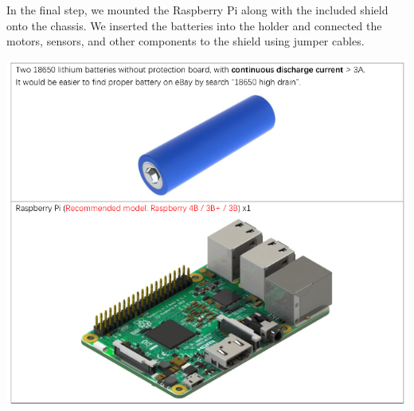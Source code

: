     \vspace{1.5em}

    \noindent
    \begin{minipage}[t]{0.63\textwidth}
        \vspace*{0pt}
        In the final step, we mounted the Raspberry Pi along with the included shield onto the chassis. We inserted the batteries into the holder and connected the motors, sensors, and other components to the shield using jumper cables.
    \end{minipage}
    \hfill
    \begin{minipage}[t]{0.33\textwidth}
        \vspace*{0pt}
        \includegraphics[width=\linewidth]{img/rpi_and_battery}
    \end{minipage}

    \vspace{1.5em}

